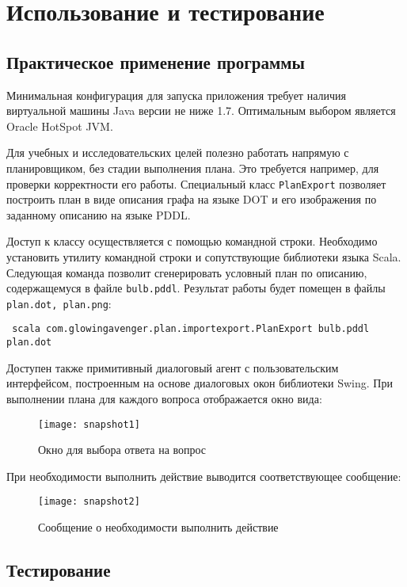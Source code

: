 \chapter{Использование и тестирование}

\section{Практическое применение программы}

Минимальная конфигурация для запуска приложения требует наличия виртуальной машины Java версии не ниже 1.7. Оптимальным выбором является Oracle HotSpot JVM.

Для учебных и исследовательских целей полезно работать напрямую с планировщиком, без стадии выполнения плана. Это требуется например, для проверки корректности его работы. Специальный класс \lstinline{PlanExport} позволяет построить план в виде описания графа на языке DOT и его изображения по заданному описанию на языке PDDL.

Доступ к классу осуществляется с помощью командной строки. Необходимо установить утилиту командной строки и сопутствующие библиотеки языка Scala. Следующая команда позволит сгенерировать условный план по описанию, содержащемуся в файле \texttt{bulb.pddl}. Результат работы будет помещен в файлы \texttt{plan.dot, plan.png}:

\begin{verbatim}
 scala com.glowingavenger.plan.importexport.PlanExport bulb.pddl plan.dot
\end{verbatim}

Доступен также примитивный диалоговый агент с пользовательским интерфейсом, построенным на основе диалоговых окон библиотеки Swing. При выполнении плана для каждого вопроса отображается окно вида:

\begin{figure}[h]
 \centering
 \texttt{[image: snapshot1]}
 \caption{Окно для выбора ответа на вопрос}
\end{figure}

При необходимости выполнить действие выводится соответствующее сообщение:

\begin{figure}[h]
 \centering
 \texttt{[image: snapshot2]}
 \caption{Сообщение о необходимости выполнить действие}
\end{figure}

\section{Тестирование}

